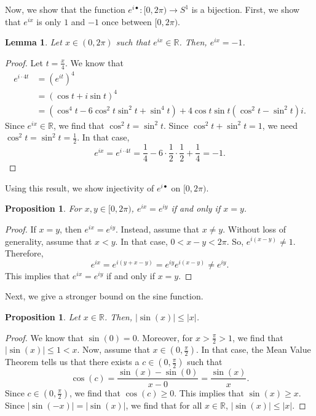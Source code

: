 \documentclass[a4paper, openany]{memoir}
\theoremstyle{definition}
\theoremstyle{plain}
\newtheorem{lemma}[definition]{Lemma}
\newtheorem{proposition}[definition]{Proposition}
\begin{document}
Now, we show that the function $e^{i \bullet}: [0, 2\pi) \to S^1$ is a bijection. First, we show that $e^{ix}$ is only $1$ and $-1$ once between $[0, 2\pi)$.
\begin{lemma}
Let $x \in (0, 2\pi)$ such that $e^{ix} \in \mathbb{R}$. Then, $e^{ix} = -1$.
\end{lemma}
\begin{proof}
Let $t = \frac{x}{4}$. We know that
\begin{align*}
    e^{i \cdot 4t} &= (e^{it})^4 \\
    &= (\cos t + i \sin t)^4 \\
    &= (\cos^4 t - 6\cos^2 t \sin^2 t + \sin^4 t) + 4 \cos t \sin t (\cos^2 t - \sin^2 t)i.
\end{align*}
Since $e^{ix} \in \mathbb{R}$, we find that $\cos^2 t = \sin^2 t$. Since $\cos^2 t + \sin^2 t = 1$, we need $\cos^2 t = \sin^2 t = \frac{1}{2}$. In that case,
\[e^{ix} = e^{i \cdot 4t} = \frac{1}{4} - 6 \cdot \frac{1}{2} \cdot \frac{1}{2} + \frac{1}{4} = -1.\]
\end{proof}
\noindent Using this result, we show injectivity of $e^{i \bullet}$ on $[0, 2\pi)$.
\begin{proposition}
For $x, y \in [0, 2\pi)$, $e^{ix} = e^{iy}$ if and only if $x = y$.
\end{proposition}
\begin{proof}
If $x = y$, then $e^{ix} = e^{iy}$. Instead, assume that $x \neq y$. Without loss of generality, assume that $x < y$. In that case, $0 < x - y < 2\pi$. So, $e^{i(x - y)} \neq 1$. Therefore,
\[e^{ix} = e^{i(y + x - y)} = e^{iy} e^{i(x-y)} \neq e^{iy}.\]
This implies that $e^{ix} = e^{iy}$ if and only if $x = y$.
\end{proof}
\noindent Next, we give a stronger bound on the sine function.
\begin{proposition}
Let $x \in \mathbb{R}$. Then, $|\sin (x)| \leqslant |x|$.
\end{proposition}
\begin{proof}
We know that $\sin (0) = 0$. Moreover, for $x > \frac{\pi}{2} > 1$, we find that $|\sin (x)| \leqslant 1 < x$. Now, assume that $x \in (0, \frac{\pi}{2})$. In that case, the Mean Value Theorem tells us that there exists a $c \in (0, \frac{\pi}{2})$ such that
\[\cos(c) = \frac{\sin (x) - \sin (0)}{x - 0} = \frac{\sin (x)}{x}.\]
Since $c \in (0, \frac{\pi}{2})$, we find that $\cos (c) \geqslant 0$. This implies that $\sin (x) \geqslant x$. Since $|\sin (-x)| = |\sin (x)|$, we find that for all $x \in \mathbb{R}$, $|\sin (x)| \leqslant |x|$.
\end{proof}
\end{document}
